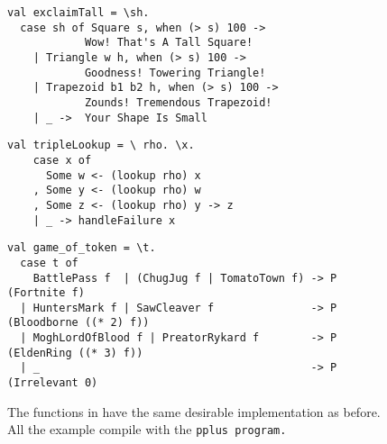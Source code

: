 \documentclass[manuscript,screen,review, 12pt, nonacm]{acmart}
\begin{document}
    \begin{figure}[ht] 
      \begin{minipage}[h]{0.54\linewidth}
        \pplst 
        \begin{lstlisting}[numbers=none, basicstyle=\tiny, xleftmargin=.2em,
          showstringspaces=false,
          frame=single]
val exclaimTall = \sh.
  case sh of Square s, when (> s) 100 -> 
            Wow! That's A Tall Square!  
    | Triangle w h, when (> s) 100 ->
            Goodness! Towering Triangle!
    | Trapezoid b1 b2 h, when (> s) 100 -> 
            Zounds! Tremendous Trapezoid!
    | _ ->  Your Shape Is Small
  \end{lstlisting}
          \label{fig:ppexclaimtall} 
      \end{minipage}%
      \begin{minipage}[h]{0.5\linewidth}
        \pplst 
        \begin{lstlisting}[numbers=none, basicstyle=\tiny, xleftmargin=2em,
                      frame=single]
  val tripleLookup = \ rho. \x.
    case x of 
      Some w <- (lookup rho) x
    , Some y <- (lookup rho) w
    , Some z <- (lookup rho) y -> z
    | _ -> handleFailure x

   \end{lstlisting}
            \label{fig:pptriplelookup} 
        \vspace{4ex}
      \end{minipage} 
      \begin{minipage}[h]{\linewidth}
        \pplst 
        \begin{lstlisting}[numbers=none, basicstyle=\tiny, xleftmargin=9em,
          showstringspaces=false,
          frame=single]
val game_of_token = \t. 
  case t of  
    BattlePass f  | (ChugJug f | TomatoTown f) -> P (Fortnite f)
  | HuntersMark f | SawCleaver f               -> P (Bloodborne ((* 2) f))
  | MoghLordOfBlood f | PreatorRykard f        -> P (EldenRing ((* 3) f))
  | _                                          -> P (Irrelevant 0)
\end{lstlisting}
          \label{fig:ppgot}
      \vspace{4ex}
      \end{minipage}%
      \caption{The functions in \PPlus have the same desirable implementation as
      before. All the example compile with the \tt{pplus} program.}
  \label{fig:ppfuncs}
    \end{figure}        
    
\end{document}

